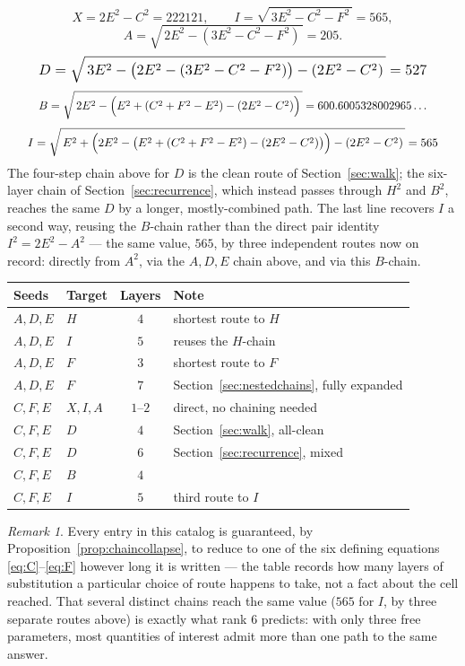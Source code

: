 \documentclass[12pt]{article}
\theoremstyle{remark}
\newtheorem{remark}[theorem]{Remark}
\begin{document}
\[
X = 2E^2-C^2 = 222121, \qquad I = \sqrt{\,3E^2-C^2-F^2\,} = 565 ,
\]
\[
A = \sqrt{\,2E^2-(3E^2-C^2-F^2)\,} = 205 .
\]
\[
\resizebox{0.9\textwidth}{!}{$\displaystyle
D = \sqrt{\,3E^2 - \bigl(2E^2-(3E^2-C^2-F^2)\bigr) - (2E^2-C^2)\,} = 527
$}
\]
\[
\resizebox{0.9\textwidth}{!}{$\displaystyle
B = \sqrt{\,2E^2 - \Bigl(E^2+(C^2+F^2-E^2)-(2E^2-C^2)\Bigr)\,}
  = 600.6005328002965\ldots
$}
\]
\[
\resizebox{0.95\textwidth}{!}{$\displaystyle
I = \sqrt{\,E^2 + \Bigl(2E^2-\bigl(E^2+(C^2+F^2-E^2)-(2E^2-C^2)\bigr)\Bigr) - (2E^2-C^2)\,}
  = 565
$}
\]
The four-step chain above for $D$ is the clean route of
Section~\ref{sec:walk}; the six-layer chain of Section~\ref{sec:recurrence},
which instead passes through $H^2$ and $B^2$, reaches the same $D$ by
a longer, mostly-combined path. The last line recovers $I$ a second
way, reusing the $B$-chain rather than the direct pair identity
$I^2=2E^2-A^2$ --- the same value, $565$, by three independent routes
now on record: directly from $A^2$, via the $A,D,E$ chain above, and
via this $B$-chain.

\begin{center}
\begin{tabular}{llcl}
\hline
Seeds & Target & Layers & Note \\
\hline
$A,D,E$ & $H$ & $4$ & shortest route to $H$ \\
$A,D,E$ & $I$ & $5$ & reuses the $H$-chain \\
$A,D,E$ & $F$ & $3$ & shortest route to $F$ \\
$A,D,E$ & $F$ & $7$ & Section~\ref{sec:nestedchains}, fully expanded \\
$C,F,E$ & $X,I,A$ & $1$--$2$ & direct, no chaining needed \\
$C,F,E$ & $D$ & $4$ & Section~\ref{sec:walk}, all-clean \\
$C,F,E$ & $D$ & $6$ & Section~\ref{sec:recurrence}, mixed \\
$C,F,E$ & $B$ & $4$ & \\
$C,F,E$ & $I$ & $5$ & third route to $I$ \\
\hline
\end{tabular}
\end{center}

\begin{remark}
Every entry in this catalog is guaranteed, by
Proposition~\ref{prop:chaincollapse}, to reduce to one of the six
defining equations \eqref{eq:C}--\eqref{eq:F} however long it is
written --- the table records how many layers of substitution a
particular choice of route happens to take, not a fact about the cell
reached. That several distinct chains reach the same value ($565$ for
$I$, by three separate routes above) is exactly what rank $6$
predicts: with only three free parameters, most quantities of interest
admit more than one path to the same answer.
\end{remark}
\end{document}
